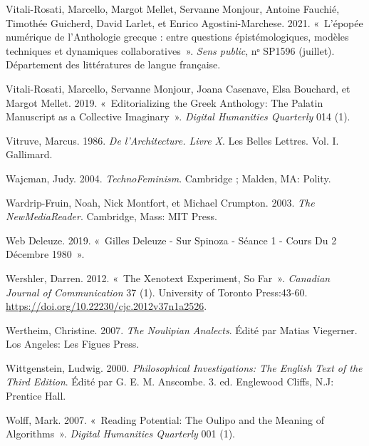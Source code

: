 \begin{CSLReferences}{1}{0}
\leavevmode{}%
Vitali-Rosati, Marcello, Margot Mellet, Servanne Monjour, Antoine
Fauchié, Timothée Guicherd, David Larlet, et Enrico Agostini-Marchese.
2021. {«~{L'{é}pop{é}e num{é}rique de l'Anthologie grecque : entre
questions {é}pist{é}mologiques, mod{è}les techniques et dynamiques
collaboratives}~»}. \emph{Sens public}, nᵒ SP1596 (juillet).
{D{é}partement des litt{é}ratures de langue fran{ç}aise}.

\leavevmode{}%
Vitali-Rosati, Marcello, Servanne Monjour, Joana Casenave, Elsa
Bouchard, et Margot Mellet. 2019. {«~Editorializing the {Greek
Anthology}: {The Palatin Manuscript} as a {Collective Imaginary}~»}.
\emph{Digital Humanities Quarterly} 014 (1).

\leavevmode{}%
Vitruve, Marcus. 1986. \emph{{De l'Architecture. Livre X}}. Les Belles
Lettres. Vol. I. {Gallimard}.

\leavevmode{}%
Wajcman, Judy. 2004. \emph{{TechnoFeminism}}. {Cambridge ; Malden, MA}:
{Polity}.

\leavevmode{}%
Wardrip-Fruin, Noah, Nick Montfort, et Michael Crumpton. 2003. \emph{The
{NewMediaReader}}. {Cambridge, Mass}: {MIT Press}.

\leavevmode{}%
Web Deleuze. 2019. {«~Gilles {Deleuze} - {Sur Spinoza} - {S{é}ance} 1 -
{Cours} Du 2 D{é}cembre 1980~»}.

\leavevmode{}%
Wershler, Darren. 2012. {«~The {Xenotext Experiment}, {So Far}~»}.
\emph{Canadian Journal of Communication} 37 (1). {University of Toronto
Press}:43‑60. \url{https://doi.org/10.22230/cjc.2012v37n1a2526}.

\leavevmode{}%
Wertheim, Christine. 2007. \emph{The {Noulipian Analects}}. Édité par
Matias Viegerner. {Los Angeles}: {Les Figues Press}.

\leavevmode{}%
Wittgenstein, Ludwig. 2000. \emph{Philosophical {Investigations}: {The
English Text} of the {Third Edition}}. Édité par G. E. M. Anscombe. 3.
ed. {Englewood Cliffs, N.J}: {Prentice Hall}.

\leavevmode{}%
Wolff, Mark. 2007. {«~Reading {Potential}: {The Oulipo} and the
{Meaning} of {Algorithms}~»}. \emph{Digital Humanities Quarterly} 001
(1).


\end{CSLReferences}
